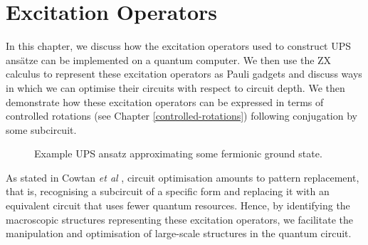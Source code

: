 \chapter{Excitation Operators}%
\label{excitation-operators}

In this chapter, we discuss how the excitation operators used to construct UPS ansätze can be implemented on a quantum computer. We then use the ZX calculus to represent these excitation operators as Pauli gadgets and discuss ways in which we can optimise their circuits with respect to circuit depth. We then demonstrate how these excitation operators can be expressed in terms of controlled rotations (see Chapter \ref{controlled-rotations}) following conjugation by some subcircuit. 

\begin{figure}[H]
    \centering
    \caption{Example UPS ansatz approximating some fermionic ground state.}
\end{figure}

As stated in Cowtan \textit{et al} \cite{Cowtan2020}, circuit optimisation amounts to pattern replacement, that is, recognising a subcircuit of a specific form and replacing it with an equivalent circuit that uses fewer quantum resources. Hence, by identifying the macroscopic structures representing these excitation operators, we facilitate the manipulation and optimisation of large-scale structures in the quantum circuit.
